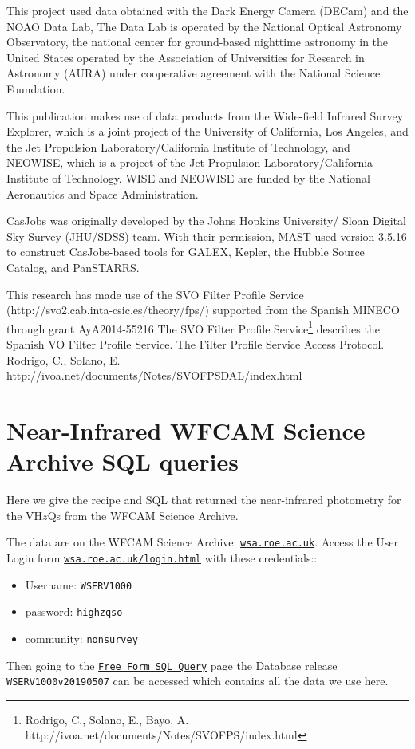 \documentclass[usenatbib]{mnras}
\begin{document}
This project used data obtained with the Dark Energy Camera (DECam)
and the NOAO Data Lab, The Data Lab is operated by the National
Optical Astronomy Observatory, the national center for ground-based
nighttime astronomy in the United States operated by the Association
of Universities for Research in Astronomy (AURA) under cooperative
agreement with the National Science Foundation.

This publication makes use of data products from the Wide-field
Infrared Survey Explorer, which is a joint project of the University
of California, Los Angeles, and the Jet Propulsion
Laboratory/California Institute of Technology, and NEOWISE, which is a
project of the Jet Propulsion Laboratory/California Institute of
Technology. WISE and NEOWISE are funded by the National Aeronautics
and Space Administration.

CasJobs was originally developed by the Johns Hopkins University/
Sloan Digital Sky Survey (JHU/SDSS) team. With their permission, MAST
used version 3.5.16 to construct CasJobs-based tools for GALEX,
Kepler, the Hubble Source Catalog, and PanSTARRS.

This research has made use of the SVO Filter Profile Service
(http://svo2.cab.inta-csic.es/theory/fps/) supported from the Spanish
MINECO through grant AyA2014-55216 
The SVO Filter Profile Service\footnote{Rodrigo, C., Solano, E., Bayo, A. http://ivoa.net/documents/Notes/SVOFPS/index.html}
describes the Spanish VO Filter Profile Service. 
The Filter Profile Service Access Protocol. Rodrigo, C., Solano, E. http://ivoa.net/documents/Notes/SVOFPSDAL/index.html



\appendix

\section{Near-Infrared WFCAM Science Archive SQL queries}\label{sec:SQL}
Here we give the recipe and SQL that returned the near-infrared photometry 
for the VH$z$Qs from the  WFCAM Science Archive. 

The data are on the WFCAM Science Archive: \href{wsa.roe.ac.uk}{\tt wsa.roe.ac.uk}. 
Access the User Login form \href{WFCAM Science Archive}{\tt wsa.roe.ac.uk/login.html} 
with these credentials::
\begin{itemize}
    \item Username: {\tt WSERV1000} 
    \item password: {\tt highzqso} 
    \item community: {\tt nonsurvey}
\end{itemize}
Then going to the
\href{http://wsa.roe.ac.uk:8080/wsa/SQL_form.jsp}{{\tt Free Form SQL
Query}} page the Database release {\tt WSERV1000v20190507} can be
accessed which contains all the data we use here.
\end{document}
